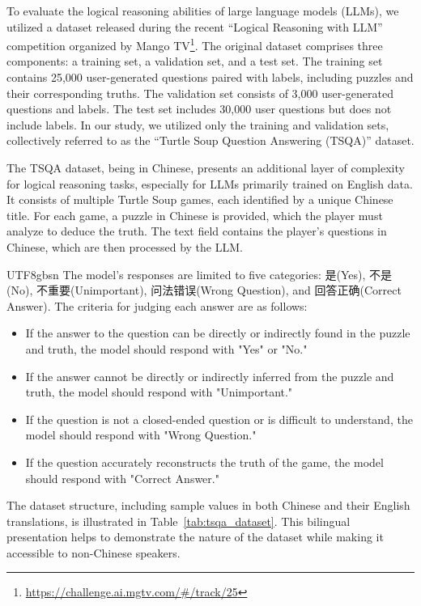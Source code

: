 \documentclass[conference]{IEEEtran}
\begin{document}
To evaluate the logical reasoning abilities of large language models (LLMs), we utilized a dataset released during the recent “Logical Reasoning with LLM” competition organized by Mango TV\footnote{\url{https://challenge.ai.mgtv.com/#/track/25}}. The original dataset comprises three components: a training set, a validation set, and a test set. The training set contains 25,000 user-generated questions paired with labels, including puzzles and their corresponding truths. The validation set consists of 3,000 user-generated questions and labels. The test set includes 30,000 user questions but does not include labels. In our study, we utilized only the training and validation sets, collectively referred to as the “Turtle Soup Question Answering (TSQA)” dataset.

The TSQA dataset, being in Chinese, presents an additional layer of complexity for logical reasoning tasks, especially for LLMs primarily trained on English data. It consists of multiple Turtle Soup games, each identified by a unique Chinese title. For each game, a puzzle in Chinese is provided, which the player must analyze to deduce the truth. The text field contains the player's questions in Chinese, which are then processed by the LLM.

\begin{CJK*}{UTF8}{gbsn}
The model's responses are limited to five categories: 是(Yes), 不是(No), 不重要(Unimportant), 问法错误(Wrong Question), and 回答正确(Correct Answer). The criteria for judging each answer are as follows:
\end{CJK*}
\begin{itemize}
    \item If the answer to the question can be directly or indirectly found in the puzzle and truth, the model should respond with "Yes" or "No."
    \item If the answer cannot be directly or indirectly inferred from the puzzle and truth, the model should respond with "Unimportant."
    \item If the question is not a closed-ended question or is difficult to understand, the model should respond with "Wrong Question."
    \item If the question accurately reconstructs the truth of the game, the model should respond with "Correct Answer."
\end{itemize}

The dataset structure, including sample values in both Chinese and their English translations, is illustrated in Table~\ref{tab:tsqa_dataset}. This bilingual presentation helps to demonstrate the nature of the dataset while making it accessible to non-Chinese speakers.
\end{document}
